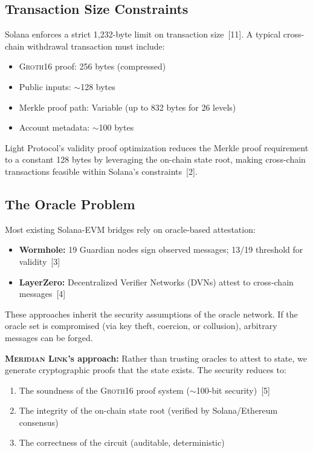 \documentclass[11pt,a4paper,twoside]{article}
\newcommand{\protocol}{\textsc{Meridian Link}}
\newcommand{\groth}{\textsc{Groth16}}
\begin{document}
\subsection{Transaction Size Constraints}

Solana enforces a strict 1,232-byte limit on transaction size~[11]. A typical cross-chain withdrawal transaction must include:
\begin{itemize}
    \item \groth{} proof: 256 bytes (compressed)
    \item Public inputs: $\sim$128 bytes
    \item Merkle proof path: Variable (up to 832 bytes for 26 levels)
    \item Account metadata: $\sim$100 bytes
\end{itemize}

Light Protocol's validity proof optimization reduces the Merkle proof requirement to a constant 128 bytes by leveraging the on-chain state root, making cross-chain transactions feasible within Solana's constraints~[2].

\subsection{The Oracle Problem}

Most existing Solana-EVM bridges rely on oracle-based attestation:

\begin{itemize}
    \item \textbf{Wormhole:} 19 Guardian nodes sign observed messages; 13/19 threshold for validity~[3]
    \item \textbf{LayerZero:} Decentralized Verifier Networks (DVNs) attest to cross-chain messages~[4]
\end{itemize}

These approaches inherit the security assumptions of the oracle network. If the oracle set is compromised (via key theft, coercion, or collusion), arbitrary messages can be forged.

\textbf{\protocol{}'s approach:} Rather than trusting oracles to attest to state, we generate cryptographic proofs that the state exists. The security reduces to:
\begin{enumerate}
    \item The soundness of the \groth{} proof system ($\sim$100-bit security)~[5]
    \item The integrity of the on-chain state root (verified by Solana/Ethereum consensus)
    \item The correctness of the circuit (auditable, deterministic)
\end{enumerate}
\end{document}
